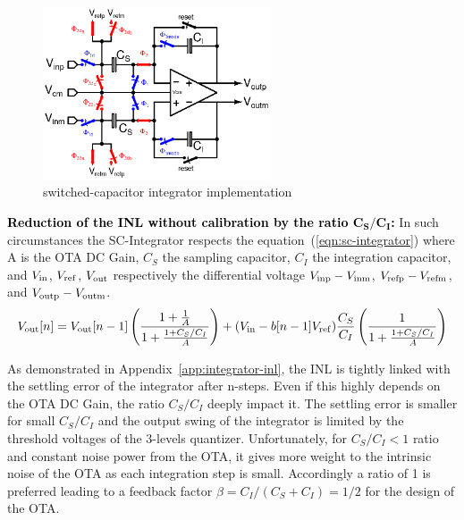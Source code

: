 \begin{figure}[htp]
	\centering
	\includegraphics[width=0.6\textwidth]{Chapter4/Figs/sc-integrator-isd.ps}
	\caption{switched-capacitor integrator implementation}
	\label{fig:isd-sc-integrator}
\end{figure}

\textbf{\textcolor{black}{Reduction of the INL without calibration by the ratio $\mathbf{C_S/C_I}$:}}
In such circumstances the SC-Integrator respects the equation~(\ref{eqn:sc-integrator}) where A is the OTA DC Gain, \(C_S \) the sampling capacitor, \(C_I \) the integration capacitor, and \(V_{\rm in} \), \(V_{\rm ref} \), \(V_{\rm out} \) respectively the differential voltage \(V_{\rm inp}-V_{\rm inm} \), \(V_{\rm refp}-V_{\rm refm} \), and \(V_{\rm outp}-V_{\rm outm} \).
\begin{equation}
    \label{eqn:sc-integrator}
    V_{\rm out}[n] = V_{\rm out}[n-1] \left(\frac{1+\frac{1}{A}}{1+\frac{1+C_S/C_I}{A}}\right) + (V_{\rm in}-b[n-1]V_{\rm ref})\frac{C_S}{C_I}\left(\frac{1}{1+\frac{1+C_S/C_I}{A}}\right)
\end{equation}

As demonstrated in Appendix~\ref{app:integrator-inl}, the INL is tightly linked with the settling error of the integrator after n-steps. Even if this highly depends on the OTA DC Gain, the ratio \(C_S/C_I \) deeply impact it. The settling error is smaller for small \(C_S/C_I \) and the output swing of the integrator is limited by the threshold voltages of the 3-levels quantizer. Unfortunately, for \(C_S/C_I < 1\) ratio and constant noise power from the OTA, it gives more weight to the intrinsic noise of the OTA as each integration step is small. Accordingly a ratio of 1 is preferred leading to a feedback factor \(\beta = C_I/(C_S+C_I) = 1/2 \) for the design of the OTA\@.

